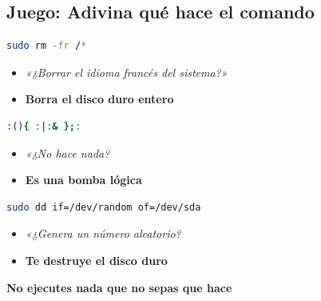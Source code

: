 \documentclass[aspectratio=43]{beamer}
\begin{document}
    \subsection{Juego: Adivina qué hace el comando}
    \begin{frame}[fragile]{\secname}{\subsecname}
        \begin{lstlisting}[language=bash]
sudo rm -fr /*\end{lstlisting}
        \begin{itemize}
            \item \textit{«¿Borrar el idioma francés del sistema?»}
            \pause\\
            \item \textbf{Borra el disco duro entero}
        \end{itemize}
        \begin{lstlisting}[language=bash]
:(){ :|:& };:\end{lstlisting}
        \begin{itemize}
            \item \textit{«¿No hace nada?}
            \pause\\
            \item \textbf{Es una bomba lógica}
        \end{itemize}
        \begin{lstlisting}[language=bash]
sudo dd if=/dev/random of=/dev/sda\end{lstlisting}
        \begin{itemize}
            \item \textit{«¿Genera un número aleatorio?}
            \pause\\
            \item \textbf{Te destruye el disco duro}
        \end{itemize}
        \pause
        \textbf{No ejecutes nada que no sepas que hace}
    \end{frame}
\end{document}
